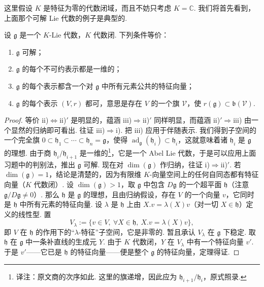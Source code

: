 \begin{numpara}[借助表示论的刻画]\label{np:ssl-2-4-3}
这里假设 $K$ 是特征为零的代数闭域，而且不妨只考虑 $K = \mathbb{C}$.
我们将首先看到，上面那个可解 Lie 代数的例子是典型的.
\begin{theorem*}[Lie]
设 $\mathfrak{g}$ 是一个 $K$-Lie 代数，$K$ 代数闭. 下列条件等价：
\begin{enumerate}[label=\roman*)]
\item $\mathfrak{g}$ 可解；
\item $\mathfrak{g}$ 的每个不可约表示都是一维的；
\item[ii)$'$] $\mathfrak{g}$ 的每个表示都含一个对 $\mathfrak{g}$ 中所有元素公共的特征向量；
\item $\mathfrak{g}$ 的每个表示 $(V, r)$ 都可，意思是存在 $V$ 的一个旗 $\mathcal{V}$，使 $r(\mathfrak{g}) \subset \mathfrak{b}(\mathcal{V})$.
\end{enumerate}
\end{theorem*}
\begin{proof}
等价 ii)$\Leftrightarrow$ii)$'$ 是明显的，蕴涵 iii)$\Rightarrow$ii)$'$ 同样明显，而蕴涵 ii)$'\Rightarrow$iii) 由一个显然的归纳即可看出.
往证 iii)$\Rightarrow$i). 把 iii) 应用于伴随表示. 我们得到子空间的一个完全旗 $0 \subset \mathfrak{h}_1 \subset \cdots \subset \mathfrak{h}_n = \mathfrak{g}$，使得 $\operatorname{ad}_{\mathfrak{g}}(\mathfrak{h}_i) \subset \mathfrak{h}_i$，这就意味着诸 $\mathfrak{h}_i$ 是 $\mathfrak{g}$ 的理想. 由于商 $\mathfrak{h}_i/\mathfrak{h}_{i+1}$ 是一维的\footnote{译注：原文商的次序如此. 这里的旗递增，因此应为 $\mathfrak h_{i+1}/\mathfrak h_i$，原式照录.}，它是一个 Abel Lie 代数，于是可以应用上面习题中的判别法，推出 $\mathfrak{g}$ 可解.
现在对 $\dim(\mathfrak{g})$ 作归纳，往证 i)$\Rightarrow$ii)$'$. 若 $\dim(\mathfrak{g}) = 1$，结论是清楚的，因为有限维 $K$-向量空间上的任何自同态都有特征向量（$K$ 代数闭）. 设 $\dim(\mathfrak{g}) > 1$，取 $\mathfrak{g}$ 中包含 $D\mathfrak{g}$ 的一个超平面 $\mathfrak{h}$（注意 $\mathfrak{g}/D\mathfrak{g} \neq 0$）. 那么 $\mathfrak{h}$ 是 $\mathfrak{g}$ 的理想，且由归纳假设，存在 $V$ 的一个向量 $v$，它同时是 $\mathfrak{h}$ 中所有元素的特征向量. 设 $\lambda$ 是 $\mathfrak{h}$ 上由 $X.v = \lambda(X)v$（对一切 $X \in \mathfrak{h}$）定义的线性型. 置
\[V_{\lambda} := \{v \in V,\ \forall X \in \mathfrak{h},\ X.v = \lambda(X)v\},\]
即 $V$ 在 $\mathfrak{h}$ 的作用下的``$\lambda$-特征''子空间，它是非零的. 暂且承认 $V_{\lambda}$ 在 $\mathfrak{g}$ 下稳定. 取 $\mathfrak{h}$ 在 $\mathfrak{g}$ 中一条补直线的生成元 $Y$. 由于 $K$ 代数闭，$Y$ 在 $V_{\lambda}$ 中有一个特征向量 $v'$. 于是 $v'$——它已是 $\mathfrak{h}$ 的特征向量——便是整个 $\mathfrak{g}$ 的特征向量，定理得证.

\end{proof}
\end{numpara}
